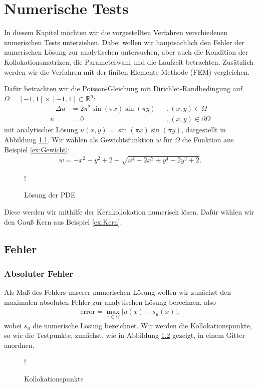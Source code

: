 \chapter{Numerische Tests}
\label{cha:NumerischeTests}

In diesem Kapitel möchten wir die vorgestellten Verfahren verschiedenen numerischen Tests unterziehen. Dabei wollen wir hauptsächlich den Fehler der numerischen Lösung zur analytischen untersuchen, aber auch die Kondition der Kollokationsmatrizen, die Parameterwahl und die Laufzeit betrachten. Zusätzlich werden wir die Verfahren mit der finiten Elemente Methode (\acs{FEM}) vergleichen.

Dafür betrachten wir die Poisson-Gleichung mit Dirichlet-Randbedingung auf $\Omega = [-1,1] \times [-1,1] \subset \mathbb{R}^n$:
\begin{align*}
- \Delta u &= 2\pi^2 \sin(\pi x)\sin(\pi y)&&, (x,y) \in \Omega\\
u &= 0&&, (x,y) \in \partial \Omega
\end{align*}
mit analytischer Lösung $u(x,y) = \sin(\pi x)\sin(\pi y)$, dargestellt in Abbildung \ref{fig:plot}. Wir wählen als Gewichtsfunktion $w$ für $\Omega$ die Funktion aus Beispiel \ref{ex:Gewicht}:
\begin{align*}
w = -x^2-y^2+2 - \sqrt{x^4 -2x^2 + y^4 -2y^2+2}.
\end{align*}
\begin{figure}[h]
\centering
\resizebox {\columnwidth} {!} {

}
\caption{Lösung der \ac{PDE}}
\label{fig:plot}
\end{figure}

Diese werden wir mithilfe der Kernkollokation numerisch lösen. Dafür wählen wir den Gauß Kern aus Beispiel \ref{ex:Kern}.

\section{Fehler}
\subsection{Absoluter Fehler}

Als Maß des Fehlers unserer numerischen Lösung wollen wir zunächst den maximalen absoluten Fehler zur analytischen Lösung berechnen, also
\begin{align*}
\text{error} = \max_{x \in \Omega} |u(x) - s_u (x)|,
\end{align*}
wobei $s_u$ die numerische Lösung bezeichnet.
Wir werden die Kollokationspunkte, so wie die Testpunkte, zunächst, wie in Abbildung \ref{fig:Kollok} gezeigt, in einem Gitter anordnen.
\begin{figure}[h]
\centering
\resizebox {\columnwidth} {!} {

}
\caption{Kollokationspunkte}
\label{fig:Kollok}
\end{figure}

